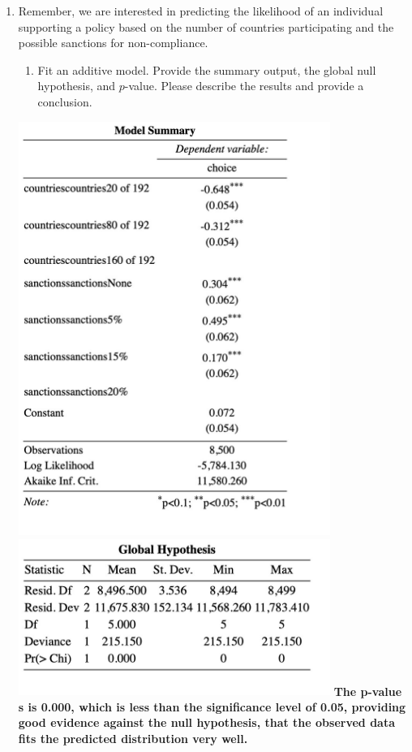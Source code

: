 \documentclass[12pt,letterpaper]{article}
\begin{document}
\begin{enumerate}
	\item
	Remember, we are interested in predicting the likelihood of an individual supporting a policy based on the number of countries participating and the possible sanctions for non-compliance.
	\begin{enumerate}
		\item [] Fit an additive model. Provide the summary output, the global null hypothesis, and $p$-value. Please describe the results and provide a conclusion.
	\end{enumerate}
	
	 

\includegraphics[width=0.8\textwidth]{model_summary.jpg}
\linebreak
\includegraphics[width=0.8\textwidth]{global_hypothesis.jpg}
\linebreak
\textbf{The p-value s is 0.000, which is less than the significance level of 0.05, providing good evidence against the null hypothesis, that the observed data fits the predicted distribution very well. }


\end{enumerate}
\end{document}
